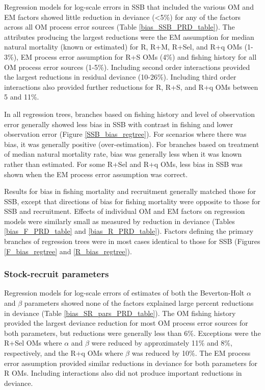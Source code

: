 \documentclass[
  12pt,
]{article}
\begin{document}
Regression models for log-scale errors in SSB that included the various
OM and EM factors showed little reduction in deviance (\textless5\%) for
any of the factors across all OM process error sources (Table
\ref{bias_SSB_PRD_table}). The attributes producing the largest
reductions were the EM assumption for median natural mortality (known or
estimated) for R, R+M, R+Sel, and R+q OMs (1-3\%), EM process error
assumption for R+S OMs (4\%) and fishing history for all OM process
error sources (1-5\%). Including second order interactions provided the
largest reductions in residual deviance (10-26\%). Including third order
interactions also provided further reductions for R, R+S, and R+q OMs
between 5 and 11\%.

In all regression trees, branches based on fishing history and level of
observation error generally showed less bias in SSB with contrast in
fishing and lower observation error (Figure \ref{SSB_bias_regtree}). For
scenarios where there was bias, it was generally positive
(over-estimation). For branches based on treatment of median natural
mortality rate, bias was generally less when it was known rather than
estimated. For some R+Sel and R+q OMs, less bias in SSB was shown when
the EM process error assumption was correct.

Results for bias in fishing mortality and recruitment generally matched
those for SSB, except that directions of bias for fishing mortality were
opposite to those for SSB and recruitment. Effects of individual OM and
EM factors on regression models were similarly small as measured by
reduction in deviance (Tables \ref{bias_F_PRD_table} and
\ref{bias_R_PRD_table}). Factors defining the primary branches of
regression trees were in most cases identical to those for SSB (Figures
\ref{F_bias_regtree} and \ref{R_bias_regtree}).

\subsubsection*{Stock-recruit
parameters}\label{stock-recruit-parameters}

Regression models for log-scale errors of estimates of both the
Beverton-Holt \(\alpha\) and \(\beta\) parameters showed none of the
factors explained large percent reductions in deviance (Table
\ref{bias_SR_pars_PRD_table}). The OM fishing history provided the
largest deviance reduction for most OM process error sources for both
parameters, but reductions were generally less than 6\%. Exceptions were
the R+Sel OMs where \(\alpha\) and \(\beta\) were reduced by
approximately 11\% and 8\%, respectively, and the R+q OMs where
\(\beta\) was reduced by 10\%. The EM process error assumption provided
similar reductions in deviance for both parameters for R OMs. Including
interactions also did not produce important reductions in deviance.
\end{document}
